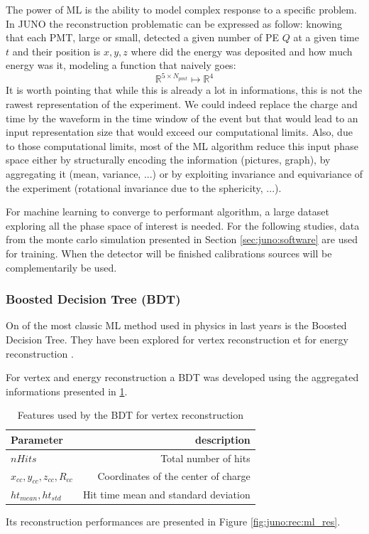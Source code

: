 \documentclass[../main.tex]{subfiles}
\begin{document}
The power of ML is the ability to model complex response to a specific problem. In JUNO the reconstruction problematic can be expressed as follow: knowing that each PMT, large or small, detected a given number of PE $Q$ at a given time $t$ and their position is $x,y,z$ where did the energy was deposited and how much energy was it, modeling a function that naively goes:
\begin{equation}
    \mathbb{R}^{5 \times N_{pmt}} \longmapsto \mathbb{R}^4
\end{equation}
It is worth pointing that while this is already a lot in informations, this is not the rawest representation of the experiment. We could indeed replace the charge and time by the waveform in the time window of the event but that would lead to an input representation size that would exceed our computational limits. Also, due to those computational limits, most of the ML algorithm reduce this input phase space either by structurally encoding the information (pictures, graph), by aggregating it (mean, variance, ...) or by exploiting invariance and equivariance of the experiment (rotational invariance due to the sphericity, ...).

For machine learning to converge to performant algorithm, a large dataset exploring all the phase space of interest is needed. For the following studies, data from the monte carlo simulation presented in Section \ref{sec:juno:software} are used for training. When the detector will be finished calibrations sources will be complementarily be used.

\subsubsection{Boosted Decision Tree (BDT)}

On of the most classic ML method used in physics in last years is the Boosted Decision Tree. They have been explored for vertex reconstruction \cite{qian_vertex_2021} et for energy reconstruction \cite{qian_vertex_2021, gavrikov_energy_2022}.

For vertex and energy reconstruction a BDT was developed using the aggregated informations presented in \ref{tab:juno:rec:bdt_vertex}.

\begin{table}[ht]
  \centering
  \begin{tabular}{l|r}
    Parameter & description \\
    \hline
    $nHits$ & Total number of hits \\
    $x_{cc}, y_{cc}, z_{cc}, R_{cc}$ & Coordinates of the center of charge \\
    $ht_{mean}, ht_{std}$ & Hit time mean and standard deviation
  \end{tabular}
  \caption{Features used by the BDT for vertex reconstruction}
  \label{tab:juno:rec:bdt_vertex}
\end{table}
Its reconstruction performances are presented in Figure \ref{fig:juno:rec:ml_res}.
\end{document}
